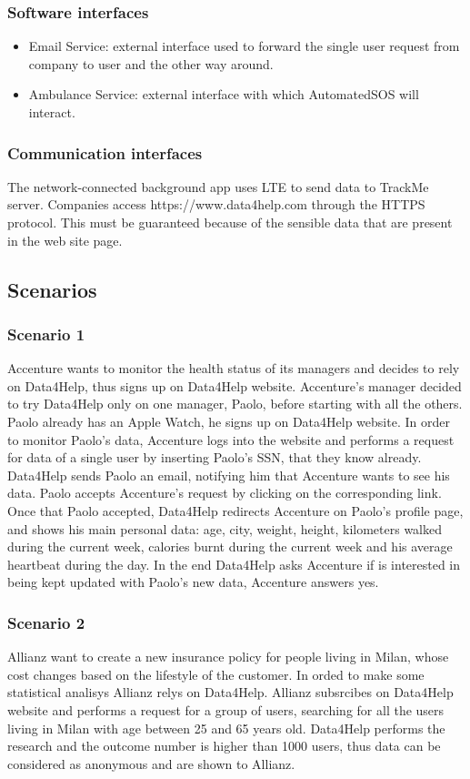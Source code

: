 \documentclass{article}
\begin{document}
\subsubsection{Software interfaces}
\begin{itemize}
	\item Email Service: external interface used to forward the single user request from company to user and the other way around. 
	\item Ambulance Service: external interface with which AutomatedSOS will interact. 
\end{itemize}
\subsubsection{Communication interfaces}
The network-connected background app uses LTE to send data to TrackMe server. Companies access https://www.data4help.com through the HTTPS protocol. This must be guaranteed because of the sensible data that are present in the web site page.  
\subsection{Scenarios}
\subsubsection{Scenario 1}
Accenture wants to monitor the health status of its managers and decides to rely on Data4Help, thus signs up on Data4Help website.
Accenture's manager decided to try Data4Help only on one manager, Paolo, before starting with all the others. Paolo already has an Apple Watch, he signs up on Data4Help website.
In order to monitor Paolo's data, Accenture logs into the website and performs a request for data of a single user by inserting Paolo's SSN, that they know already.
Data4Help sends Paolo an email, notifying him that Accenture wants to see his data.
Paolo accepts Accenture's request by clicking on the corresponding link.
Once that Paolo accepted, Data4Help redirects Accenture on Paolo's profile page, and shows his main personal data: age, city, weight, height, kilometers walked during the current week, calories burnt during the current week and his average heartbeat during the day.
In the end Data4Help asks Accenture if is interested in being kept updated with Paolo's new data, Accenture answers yes.
\subsubsection{Scenario 2}
Allianz want to create a new insurance policy for people living in Milan, whose cost changes based on the lifestyle of the customer. In orded to make some statistical analisys Allianz relys on Data4Help.
Allianz subsrcibes on Data4Help website and performs a request for a group of users, searching for all the users living in Milan with age between 25 and 65 years old.
Data4Help performs the research and the outcome number is higher than 1000 users, thus data can be considered as anonymous and are shown to Allianz.
\end{document}
